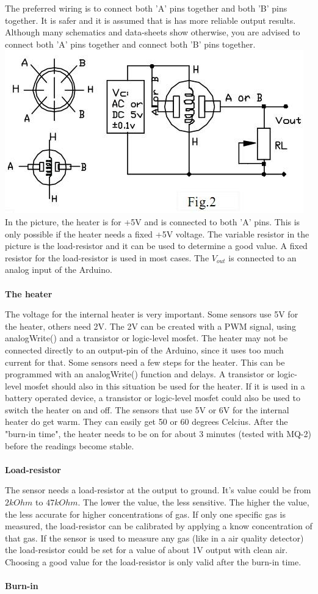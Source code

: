 \documentclass[11pt]{report}
\begin{document}
	The preferred wiring is to connect both 'A' pins together and both 'B' pins together. It is safer and it is assumed that is has more reliable output results. Although many schematics and data-sheets show otherwise, you are advised to connect both 'A' pins together and connect both 'B' pins together.
	\includegraphics{mq135.jpg}
	In the picture, the heater is for +5V and is connected to both 'A' pins. This is only possible if the heater needs a fixed +5V voltage.
	The variable resistor in the picture is the load-resistor and it can be used to determine a good value. A fixed resistor for the load-resistor is used in most cases.
	The $V_{out}$ is connected to an analog input of the Arduino.
	\\\\
	\textbf{The heater}
	
	The voltage for the internal heater is very important.
	Some sensors use 5V for the heater, others need 2V. The 2V can be created with a PWM signal, using analogWrite() and a transistor or logic-level mosfet.
	The heater may not be connected directly to an output-pin of the Arduino, since it uses too much current for that.
	Some sensors need a few steps for the heater. This can be programmed with an analogWrite() function and delays. A transistor or logic-level mosfet should also in this situation be used for the heater.
	If it is used in a battery operated device, a transistor or logic-level mosfet could also be used to switch the heater on and off.
	The sensors that use 5V or 6V for the internal heater do get warm. They can easily get 50 or 60 degrees Celcius.
	After the "burn-in time", the heater needs to be on for about 3 minutes (tested with MQ-2) before the readings become stable.
	\\\\
	\textbf{Load-resistor}
	
	The sensor needs a load-resistor at the output to ground. It's value could be from $2kOhm$ to $47kOhm$. The lower the value, the less sensitive. The higher the value, the less accurate for higher concentrations of gas.
	If only one specific gas is measured, the load-resistor can be calibrated by applying a know concentration of that gas. If the sensor is used to measure any gas (like in a air quality detector) the load-resistor could be set for a value of about 1V output with clean air.
	Choosing a good value for the load-resistor is only valid after the burn-in time.
	\\\\
	\textbf{Burn-in}
	
\end{document}

